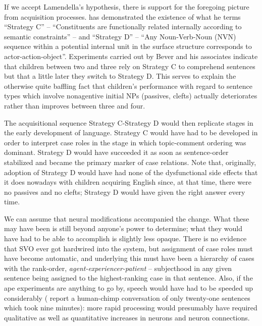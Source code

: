 If we accept Lamendella's hypothesis, there is support for the foregoing picture from acquisition processes. \citet{Bever1970} has demonstrated the existence of what he terms ``Strategy C'' -- ``Constituents are functionally related internally according to semantic constraints'' -- and ``Strategy D'' -- ``Any Noun-Verb-Noun (NVN) sequence within a potential internal unit in the surface structure corresponds to actor-action-object''. Experiments carried out by Bever and his associates indicate that children between two and three rely on Strategy C to comprehend sentences but that a little later they switch to Strategy D. This serves to explain the otherwise quite baffling fact that children's performance with regard to sentence types which involve nonagentive initial NPs (passives, clefts) actually deteriorates rather than improves between three and four.

The acquisitional sequence Strategy C-Strategy D would then replicate stages in the early development of language. Strategy C would have had to be developed in order to interpret case roles in the stage
in which topic-comment ordering was dominant. Strategy D would have succeeded it as soon as sentence-order stabilized and became the primary marker of case relations. Note that, originally, adoption of Strategy D would have had none of the dysfunctional side effects that it does nowadays with children acquiring English since, at that time, there were no passives and no clefts; Strategy D would have given the right answer every time.

We can assume that neural modifications accompanied the change. What these may have been is still beyond anyone's power to determine; what they would have had to be able to accomplish is slightly less opaque. There is no evidence that SVO ever got hardwired into the system, but assignment of case roles must have become automatic, and underlying this must have been a hierarchy of cases with the rank-order, \textit{agent-experiencer-patient} -- subjecthood in any given sentence being assigned to the highest-ranking case in that sentence. Also, if the ape experiments are anything to go by, speech would have had to be speeded up considerably (\citet{RumbaughEtAl1976} report a human-chimp conversation of only twenty-one sentences which took nine minutes): more rapid processing would presumably have required qualitative as well as quantitative increases in neurons and neuron connections.

